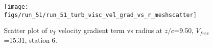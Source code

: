 \begin{figure}[H]
\centering
\texttt{[image: figs/run\_51/run\_51\_turb\_visc\_vel\_grad\_vs\_r\_meshscatter]}
\caption{Scatter plot of $\nu_T$ velocity gradient term vs radius at $z/c$=9.50, $V_{free}$=15.31, station 6.}
\label{fig:run_51_turb_visc_vel_grad_vs_r_meshscatter}
\end{figure}



